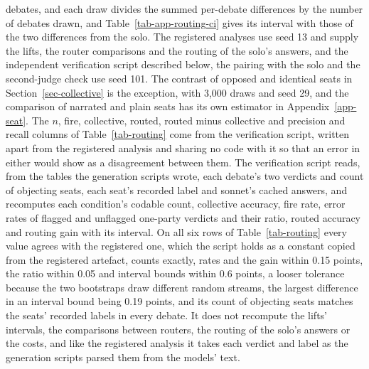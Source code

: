 debates, and each draw divides the summed per-debate differences by the
number of debates drawn, and Table~\ref{tab-app-routing-ci} gives its interval
with those of the two differences from the solo. The registered analyses use seed 13 and
supply the lifts, the router comparisons and the routing of the solo's
answers, and the independent verification script described below, the
pairing with the solo and the second-judge check use seed 101. The contrast of opposed and identical seats
in Section~\ref{sec-collective} is the exception, with 3,000 draws and seed
29, and the comparison of narrated and plain seats has its own estimator in
Appendix~\ref{app-seat}. The $n$, fire, collective, routed, routed minus
collective and precision and recall columns of Table~\ref{tab-routing} come
from the verification script, written apart from the registered analysis and
sharing no code with it so that an error in either would show as a
disagreement between them. The verification script reads, from the tables
the generation scripts wrote, each debate's two verdicts and count of
objecting seats, each seat's recorded label and sonnet's cached answers, and
recomputes each condition's codable
count, collective accuracy, fire rate, error rates of flagged and unflagged
one-party verdicts and their ratio, routed accuracy and routing gain with its
interval. On all six rows of Table~\ref{tab-routing} every value agrees with
the registered one,
which the script holds as a constant copied from the registered artefact,
counts exactly, rates and the gain within 0.15 points, the ratio within 0.05
and interval bounds within 0.6 points, a looser tolerance because the two
bootstraps draw different random streams, the largest difference in an
interval bound being 0.19 points, and its count of objecting seats matches
the seats' recorded labels in every debate. It does not recompute the lifts'
intervals, the comparisons between routers, the routing of the solo's
answers or the costs, and like the registered analysis it takes each verdict
and label as the generation scripts parsed them from the models' text.
